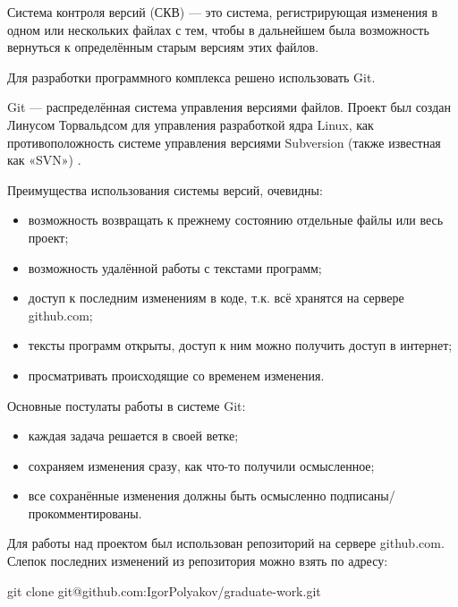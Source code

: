 Система контроля версий (СКВ) — это система, регистрирующая изменения в одном или нескольких файлах с тем, чтобы в дальнейшем была возможность вернуться к определённым старым версиям этих файлов.

Для разработки программного комплекса решено использовать Git.

Git  — распределённая система управления версиями файлов. Проект был создан Линусом Торвальдсом для управления разработкой ядра Linux, как противоположность системе управления версиями Subversion (также известная как «SVN») \cite{progit}.

Преимущества использования системы версий, очевидны:
\begin{itemize}
\item возможность возвращать к прежнему состоянию отдельные файлы или весь проект;
\item возможность удалённой работы с текстами программ;
\item доступ к последним изменениям в коде, т.к. всё хранятся на сервере github.com;
\item тексты программ открыты, доступ к ним можно получить доступ в интернет;
\item просматривать происходящие со временем изменения.
\end{itemize}

Основные постулаты работы в системе Git:

\begin{itemize}
\item каждая задача решается в своей ветке;
\item сохраняем изменения сразу, как что-то получили осмысленное;
\item все сохранённые изменения должны быть осмысленно подписаны/прокомментированы.
\end{itemize}

Для работы над проектом был использован репозиторий на сервере github.com. Слепок последних изменений из репозитория можно взять по адресу:

git clone git@github.com:IgorPolyakov/graduate-work.git